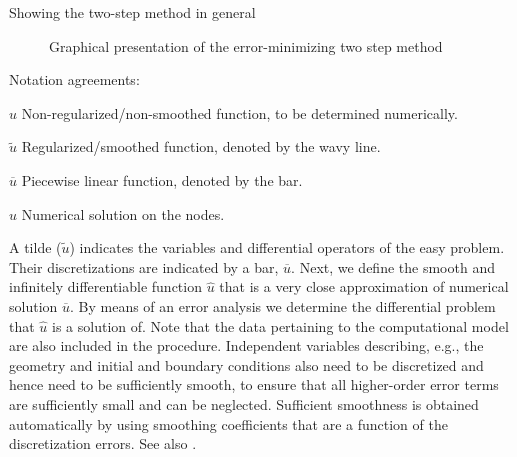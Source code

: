 Showing the two-step method in general
%
\begin{figure}[H]
    \begin{center}
        \def\svgwidth{1.0\textwidth} %
        \resizebox{0.9\textwidth}{!}{
            
        }
    \end{center}
    \caption{Graphical presentation of the error-minimizing two step method}\label{fig:two_step_method}
\end{figure}
%
Notation agreements:
\begin{symbollist}
    \item[$u$] Non-regularized/non-smoothed function, to be determined numerically.
    \item[$\widetilde u$] Regularized/smoothed function, denoted by the wavy line.
    \item[$\overline u$] Piecewise linear function, denoted by the bar.
    \item[$\widehat u$] Numerical solution on the nodes.
\end{symbollist}

A tilde ($\widetilde u$) indicates the variables and differential operators of the easy
problem.
Their discretizations are indicated by a bar, $\overline {u}$.
Next, we define the smooth and infinitely differentiable function $\widehat u$ that is a very close approximation of numerical solution $\overline {u}$.
By means of an error analysis we determine the differential problem that $\widehat u$ is a solution of.
Note that the data pertaining to the computational model are also included in the procedure.
Independent variables describing, e.g., the geometry and initial and boundary conditions also need to be discretized and hence need to be sufficiently smooth, to ensure that all higher-order error terms are sufficiently small and can be neglected.
Sufficient smoothness is obtained automatically by using smoothing coefficients that are a function of the discretization errors.
See also \citet{Borsboom2001}.

